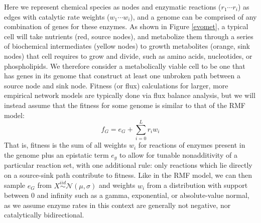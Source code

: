 \documentclass[paper=a4, fontsize=11pt,twoside]{scrartcl}       %
\begin{document}
Here we represent chemical species as nodes and enzymatic reactions ($r_1\cdots r_i$) as edges with catalytic rate weights ($w_1 \cdots w_i$), and a genome can be comprised of any combination of genes for these enzymes. As shown in Figure \ref{evomet}, a typical cell will take nutrients (red, source nodes), and metabolize them through a series of biochemical intermediates (yellow nodes) to growth metabolites (orange, sink nodes) that cell requires to grow and divide, such as amino acids, nucleotides, or phospholipids. We therefore consider a metabolically viable cell to be one that has genes in its genome that construct at least one unbroken path between a source node and sink node. Fitness (or flux) calculations for larger, more empirical network models are typically done via flux balance analysis, \cite{orthWhatFluxBalance2010} but we will instead assume that the fitness for some genome is similar to that of the RMF model: $$f_G = e_G + \displaystyle\sum_{i=0}^{L}r_i w_i $$ That is, fitness is the sum of all weights $w_i$ for reactions of enzymes present in the genome plus an epistatic term $e_g$ to allow for tunable nonadditivity of a particular reaction set, with one additional rule: only reactions which lie directly on a source-sink path contribute to fitness. Like in the RMF model, we can then sample $e_G$ from $X \overset{iid}{\sim} \mathcal{N}(\mu, \sigma)$ and weights $w_i$ from a distribution with support between 0 and infinity such as a gamma, exponential, or absolute-value normal, as we assume enzyme rates in this context are generally not negative, nor catalytically bidirectional. 
\end{document}
